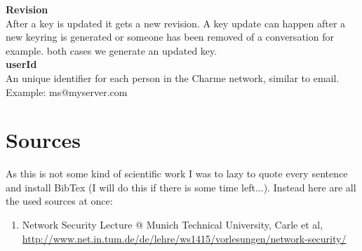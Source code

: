 \documentclass{scrartcl}
\begin{document}
\textbf{Revision}\\
 After a key is updated it gets a new revision. A key update can happen after a new keyring is generated or someone has been removed of a conversation for example. both cases we generate an updated key.
\\

\textbf{userId}\\  An unique identifier for each person in the Charme network, similar to email. Example: ms@myserver.com



\section{Sources}
As this is not some kind of scientific work I was to lazy to quote every sentence and install BibTex (I will do this if there is some time left...). Instead here are all the used sources at once: 
\begin{enumerate}
\item Network Security Lecture @ Munich Technical University, Carle et al,  \url{http://www.net.in.tum.de/de/lehre/ws1415/vorlesungen/network-security/}
\end{enumerate}
  
\end{document}
